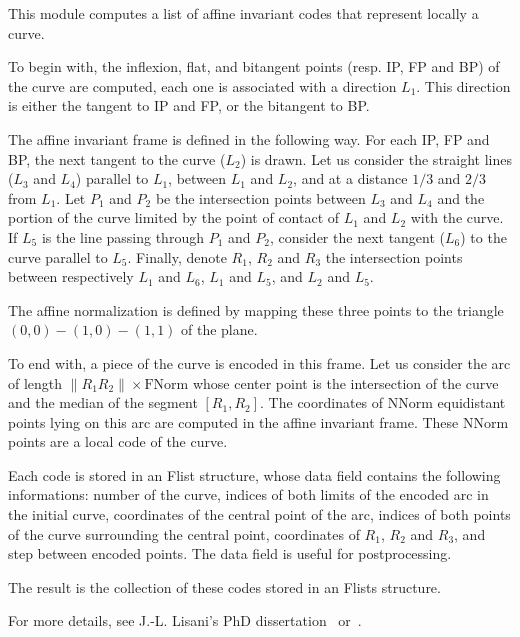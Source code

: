 This module computes a list of affine invariant 
codes that represent locally a curve.

To begin with, the inflexion, flat, and bitangent points (resp. IP, FP and BP) of the curve are computed, each one is associated with a direction $L_1$. This direction is either the tangent to IP and FP, or the bitangent to BP.

The affine invariant frame is defined in the following way. For each IP, FP and BP, the next tangent to the curve ($L_2$) is drawn. Let us consider the straight lines ($L_3$ and $L_4$) parallel to $L_1$, between $L_1$ and $L_2$, and at a distance $1/3$ and $2/3$ from $L_1$. Let $P_1$ and $P_2$ be the intersection points between $L_3$ and $L_4$ and the portion of the curve limited by the point of contact of $L_1$ and $L_2$ with the curve. If $L_5$ is the line passing through $P_1$ and $P_2$, consider the next tangent ($L_6$) to the curve parallel to $L_5$. Finally, denote $R_1$, $R_2$ and $R_3$ the intersection points between respectively $L_1$ and $L_6$, $L_1$ and $L_5$, and $L_2$ and $L_5$.

The affine normalization is defined by mapping these three points to the triangle $(0,0)-(1,0)-(1,1)$ of the plane.

To end with, a piece of the curve is encoded in this frame. Let us consider the arc of length $\| R_1R_2 \| \times \mbox{FNorm}$ whose center point is the intersection of the curve and the median of the segment $[R_1,R_2]$. The coordinates of $\mbox{NNorm}$ equidistant points lying on this arc are computed in the affine invariant frame. These $\mbox{NNorm}$ points are a local code of the curve.

\medskip

Each code is stored in an Flist structure, whose data field contains the following informations: number of the curve, indices of both limits of the encoded arc in the initial curve, coordinates of the central point of the arc, indices of both points of the curve surrounding the central point, coordinates of $R_1$, $R_2$ and $R_3$, and step between encoded points. The data field is useful for postprocessing.

The result is the collection of these codes stored in an Flists structure.

\medskip

For more details, see J.-L. Lisani's PhD dissertation~\cite{lisani:comparaison} 
or~\cite{lisani.monasse.ea:on}.
